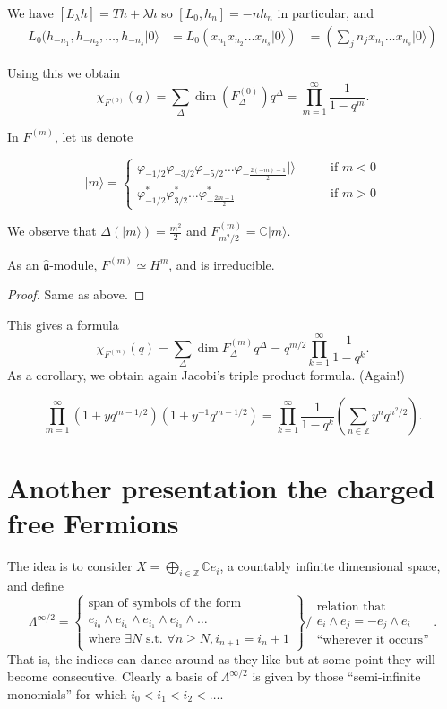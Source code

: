 We have $[L_\lambda h]=Th+\lambda h$
so $[L_0,h_n]=-nh_n$ in particular,
and 
\begin{align*}
L_0(h_{-n_1},h_{-n_2},\ldots,h_{-n_s}|0\rangle&=
L_0(x_{n_1}x_{n_2}\ldots x_{n_s}|0\rangle)
&=\left(\sum_{j}n_j x_{n_1}\ldots x_{n_s}|0\rangle\right)
\end{align*}

\noindent
Using this we obtain
 $$
\chi_{F^{(0)}}(q)=\sum_{\Delta}\dim(F^{(0)}_{\Delta})q^{\Delta}
=\prod_{m=1}^{\infty}\frac{1}{1-q^m}.
$$

In $F^{(m)}$, let us denote

$$
|m\rangle=\begin{cases}
\varphi_{-1/2}\varphi_{-3/2}\varphi_{-5/2}\ldots
\varphi_{-\frac{2(-m)-1}{2}}|\rangle\qquad &\text{if }m<0 \\
\varphi^*_{-1/2}\varphi^*_{3/2}\ldots
\varphi^*_{-\frac{2m-1}{2}}\qquad &\text{if }m>0
\end{cases}
$$

We observe that 
$\Delta(|m\rangle)=\frac{m^2}{2}$ 
and $F^{(m)}_{m^2/2}=\mathbb{C} |m\rangle$.

\begin{proposition}
\label{proposition-isomorphic-representations-for-all-m}
As an $\hat{\mathfrak{a}}$-module,
$F^{(m)}\simeq H^m$, and is irreducible.
\end{proposition}

\begin{proof}
Same as above.
\end{proof}

This gives a formula
$$
\chi_{F^{(m)}}(q)=\sum_{\Delta}\dim F^{(m)}_\Delta q^\Delta
=q^{m/2}\prod_{k=1}^\infty \frac{1}{1-q^k}.
$$
As a corollary, we obtain again
Jacobi's triple product formula. (Again!)

$$
\prod_{m=1}^\infty(1+yq^{m-1/2})(1+y^{-1}q^{m-1/2})
=\prod_{k=1}^\infty\frac{1}{1-q^k}
\left(\sum_{n \in \mathbb{Z}}y^nq^{n^2/2}\right).
$$

\section{Another presentation the charged free Fermions}
\label{section-another-presentation-of-fermions}

The idea is to consider $X = \bigoplus_{i \in \mathbb{Z}} \mathbb{C} e_i$,
a countably infinite dimensional space,
and define
\begin{equation}
\label{equation-semi-inifinite}
\Lambda^{\infty/2}=
\left\{\substack{\text{span of symbols of the form} \\ 
e_{i_0}\wedge e_{i_1}\wedge e_{i_1} \wedge e_{i_3}\wedge\ldots\\
\text{where }\exists N\text{ s.t. }\forall n \geq  N,
i_{n+1}=i_n+1}\right\}\Big/
\substack{\text{relation that} \\ e_i\wedge e_j=- e_j \wedge e_i\\
\text{``wherever it occurs''}}.
\end{equation}
That is, the indices can dance around as they like 
but at some point they will become
consecutive.
Clearly a basis of $\Lambda^{\infty/2}$ is given 
by those ``semi-infinite monomials''
for which 
$i_0 < i_1< i_2<\ldots$.

